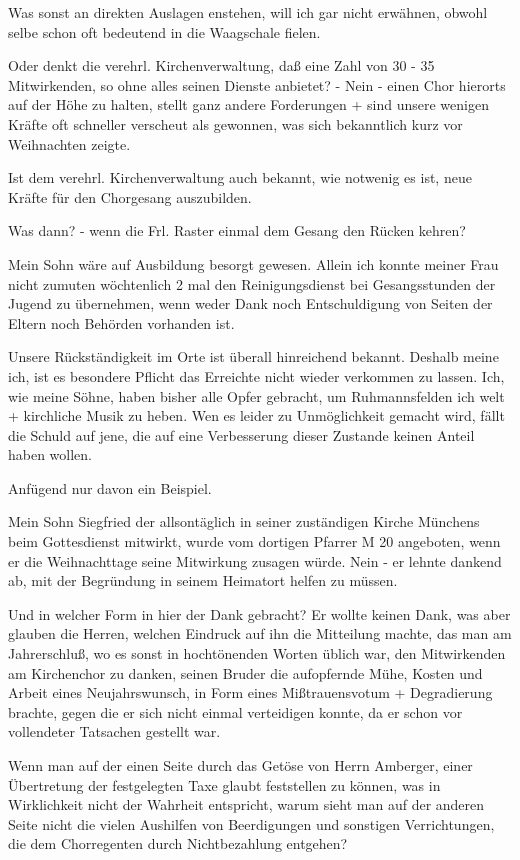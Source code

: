 \documentclass[12pt,a4pager]{book}
\begin{document}
Was sonst an direkten Auslagen enstehen, will ich gar nicht erwähnen, obwohl
selbe schon oft bedeutend in die Waagschale fielen.

Oder denkt die verehrl. Kirchenverwaltung, daß eine Zahl von 30 - 35
Mitwirkenden, so ohne alles seinen Dienste anbietet? - Nein - einen Chor
hierorts auf der Höhe zu halten, stellt ganz andere Forderungen + sind unsere
wenigen Kräfte oft schneller verscheut als gewonnen, was sich bekanntlich kurz
vor Weihnachten zeigte.

Ist dem verehrl. Kirchenverwaltung auch bekannt, wie notwenig es ist, neue
Kräfte für den Chorgesang auszubilden.

Was dann? - wenn die Frl. Raster einmal dem Gesang den Rücken kehren?

Mein Sohn wäre auf Ausbildung besorgt gewesen. Allein ich konnte meiner Frau
nicht zumuten wöchtenlich 2 mal den Reinigungsdienst bei Gesangsstunden der
Jugend zu übernehmen, wenn weder Dank noch Entschuldigung von Seiten der Eltern
noch Behörden vorhanden ist.

Unsere Rückständigkeit im Orte ist überall hinreichend bekannt. Deshalb meine
ich, ist es besondere Pflicht das Erreichte nicht wieder verkommen zu lassen.
Ich, wie meine Söhne, haben bisher alle Opfer gebracht, um Ruhmannsfelden ich
welt + kirchliche Musik zu heben. Wen es leider zu Unmöglichkeit gemacht wird,
fällt die Schuld auf jene, die auf eine Verbesserung dieser Zustande keinen
Anteil haben wollen.

Anfügend nur davon ein Beispiel.

Mein Sohn Siegfried der allsontäglich in seiner zuständigen Kirche Münchens beim
Gottesdienst mitwirkt, wurde vom dortigen Pfarrer M 20 angeboten, wenn er die
Weihnachttage seine Mitwirkung zusagen würde. Nein - er lehnte dankend ab, mit
der Begründung in seinem Heimatort helfen zu müssen.

Und in welcher Form in hier der Dank gebracht? Er wollte keinen Dank, was aber
glauben die Herren, welchen Eindruck auf ihn die Mitteilung machte, das man am
Jahrerschluß, wo es sonst in hochtönenden Worten üblich war, den Mitwirkenden am
Kirchenchor zu danken, seinen Bruder die aufopfernde Mühe, Kosten und Arbeit
eines Neujahrswunsch, in Form eines Mißtrauensvotum + Degradierung brachte,
gegen die er sich nicht einmal verteidigen konnte, da er schon vor vollendeter
Tatsachen gestellt war.

Wenn man auf der einen Seite durch das Getöse von Herrn Amberger, einer
Übertretung der festgelegten Taxe glaubt feststellen zu können, was in
Wirklichkeit nicht der Wahrheit entspricht, warum sieht man auf der anderen
Seite nicht die vielen Aushilfen von Beerdigungen und sonstigen Verrichtungen,
die dem Chorregenten durch Nichtbezahlung entgehen?
\end{document}
